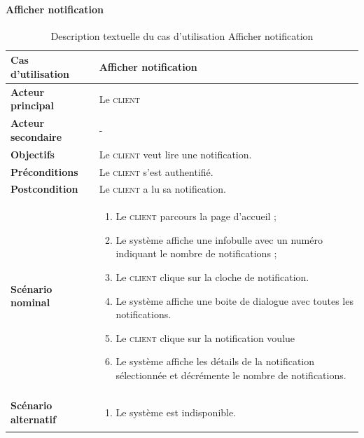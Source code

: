         \paragraph[Afficher notification]{Afficher notification}
        \begin{longtable}{p{4cm} p{9cm}}
            \caption{Description textuelle du cas d’utilisation Afficher notification}
            \label{table:usecaseAfficherNotification}
            \\\hline\hline
                \textbf{Cas d’utilisation} & \textbf{Afficher notification}
            \\\hline\hline
                    \textbf{Acteur principal} & Le \textsc{client}
                \\
                    \textbf{Acteur secondaire} & -
                \\
                    \textbf{Objectifs} & Le \textsc{client} veut lire une
                    notification.
                \\
                    \textbf{Préconditions} & Le \textsc{client} s’est authentifié.
                \\
                    \textbf{Postcondition} & Le \textsc{client} a lu sa notification.
                \\
                \textbf{Scénario nominal} &
                    \begin{enumerate}[leftmargin=*]
                        \item Le \textsc{client} parcours la page d’accueil ;
                        \item Le système affiche une infobulle avec un numéro indiquant le nombre de
                        notifications ;
                        \item Le \textsc{client} clique sur la cloche de notification.
                        \item Le système affiche une boite de dialogue avec toutes les notifications.
                        \item Le \textsc{client} clique sur la notification voulue
                        \item Le système affiche les détails de la notification sélectionnée et décrémente le
                        nombre de notifications.
                    \end{enumerate}
                \\
                \textbf{Scénario alternatif} &
                    \begin{enumerate}[leftmargin=*]
                        \item Le système est indisponible.
                    \end{enumerate}
            \\\bottomrule
        \end{longtable}

